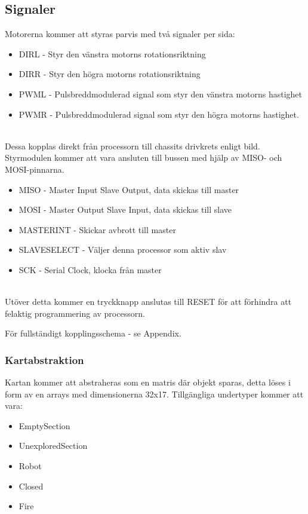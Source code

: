 \documentclass[a4paper,12pt,fleqn]{article}
\begin{document}
\subsection{Signaler}
Motorerna kommer att styras parvis med två signaler per sida:
\begin{itemize}
	\item DIRL - Styr den vänstra motorns rotationsriktning
	\item DIRR - Styr den högra motorns rotationsriktning
	\item PWML - Pulsbreddmodulerad signal som styr den vänstra motorns hastighet
	\item PWMR - Pulsbreddmodulerad signal som styr den högra motorns hastighet.
\end{itemize}
~\\
Dessa kopplas direkt från processorn till chassits drivkrets enligt bild.
Styrmodulen kommer att vara ansluten till bussen med hjälp av MISO- och MOSI-pinnarna.

\begin{itemize}
	\item MISO - Master Input Slave Output, data skickas till master
	\item MOSI - Master Output Slave Input, data skickas till slave
	\item MASTERINT - Skickar avbrott till master
	\item SLAVESELECT - Väljer denna processor som aktiv slav
	\item SCK - Serial Clock, klocka från master
\end{itemize}
~\\
Utöver detta kommer en tryckknapp anslutas till RESET för att förhindra att felaktig programmering av processorn. 

För fullständigt kopplingsschema - se Appendix. 

\newpage

\subsubsection{Kartabstraktion}
Kartan kommer att abstraheras som en matris där objekt sparas, detta löses i form av en arrays med dimensionerna 32x17.
Tillgängliga undertyper kommer att vara:

\begin{itemize}
\item{EmptySection}
\item{UnexploredSection}
\item{Robot}
\item{Closed}
\item{Fire}
\end{itemize}
\end{document}
